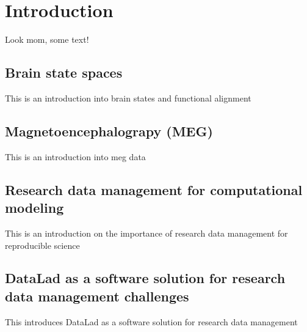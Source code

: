 
\chapter{Introduction}
\label{chap:k1}

Look mom, some text!

\section{Brain state spaces}
This is an introduction into brain states and functional alignment
\pagebreak

\section{Magnetoencephalograpy (MEG)}
This is an introduction into \gls{meg} data
\pagebreak

\section{Research data management for computational modeling}
This is an introduction on the importance of research data management for reproducible science

\pagebreak

\section{DataLad as a software solution for research data management challenges}
This introduces DataLad as a software solution for research data management

\pagebreak

